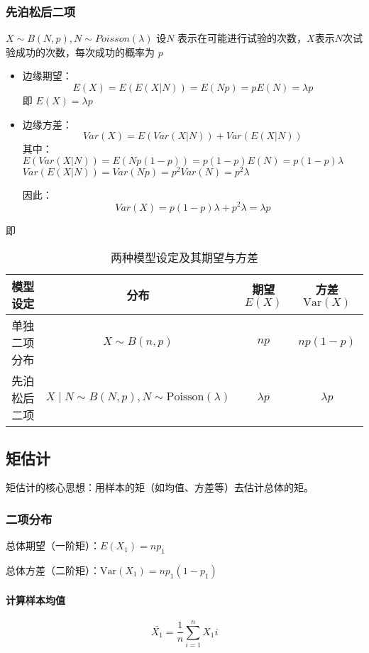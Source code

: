 \documentclass{article}
\begin{document}
    \subsubsection{先泊松后二项}$ X \sim B(N, p),
    N \sim Poisson(\lambda)$ 设$ N $ 表示在可能进行试验的次数，$X$表示$N$次试验成功的次数，每次成功的概率为 $ p $
    \begin{itemize}
        \item 边缘期望： $$
  E(X) = E(E(X|N)) = E(Np) = pE(N) = \lambda p
  $$
  即 $ E(X) = \lambda p $
        \item 边缘方差：$$
  Var(X) = E(Var(X|N)) + Var(E(X|N))
  $$
  其中：
  $ E(Var(X|N)) = E(Np(1-p)) = p(1-p)E(N) = p(1-p)\lambda $
  $ Var(E(X|N)) = Var(Np) = p^2 Var(N) = p^2 \lambda $
  
  因此：
  $$
  Var(X) = p(1-p)\lambda + p^2 \lambda = \lambda p
  $$
    \end{itemize} 

即
\begin{table}[htbp]
\centering
\caption{两种模型设定及其期望与方差}
\begin{tabular}{|c|c|c|c|}
\hline
\textbf{模型设定} & \textbf{分布} & \textbf{期望 $ E(X) $} & \textbf{方差 $ \text{Var}(X) $} \\
\hline
单独二项分布 & $ X \sim B(n, p) $ & $ np $ & $ np(1-p) $ \\
\hline
先泊松后二项 & $ X \mid N \sim B(N, p), N \sim \text{Poisson}(\lambda) $ & $ \lambda p $ & $ \lambda p $ \\
\hline
\end{tabular}
\end{table}

\subsection{矩估计}
矩估计的核心思想：用样本的矩（如均值、方差等）去估计总体的矩。
\subsubsection{二项分布}

总体期望（一阶矩）：$ E(X_1) = np_1 $

总体方差（二阶矩）：$ \text{Var}(X_1) = np_1(1-p_1) $

\paragraph{计算样本均值}
$$
\bar{X_1} = \frac{1}{n} \sum_{i=1}^{n} X_1i
$$
\end{document}
